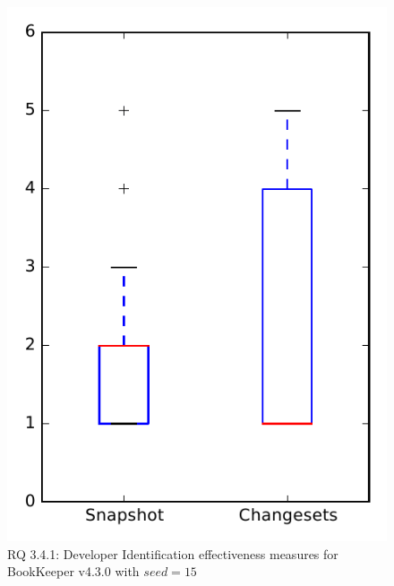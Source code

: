 
\begin{figure}
\centering
\includegraphics[height=0.4\textheight]{figures/dit_seed/rq1_bookkeeper_15}
\caption{RQ 3.4.1: Developer Identification effectiveness measures for BookKeeper v4.3.0 with $seed=15$}
\label{fig:dit_seed:rq1:bookkeeper}
\end{figure}
